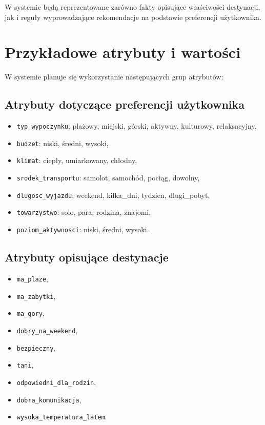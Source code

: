 \documentclass[12pt,a4paper]{article}
\begin{document}
W systemie będą reprezentowane zarówno fakty opisujące właściwości destynacji, jak i reguły wyprowadzające rekomendacje na podstawie preferencji użytkownika.

\section{Przykładowe atrybuty i wartości}

W systemie planuje się wykorzystanie następujących grup atrybutów:

\subsection{Atrybuty dotyczące preferencji użytkownika}
\begin{itemize}
    \item \texttt{typ\_wypoczynku}: plażowy, miejski, górski, aktywny, kulturowy, relaksacyjny,
    \item \texttt{budzet}: niski, średni, wysoki,
    \item \texttt{klimat}: ciepły, umiarkowany, chłodny,
    \item \texttt{srodek\_transportu}: samolot, samochód, pociąg, dowolny,
    \item \texttt{dlugosc\_wyjazdu}: weekend, kilka\_dni, tydzien, dlugi\_pobyt,
    \item \texttt{towarzystwo}: solo, para, rodzina, znajomi,
    \item \texttt{poziom\_aktywnosci}: niski, średni, wysoki.
\end{itemize}

\subsection{Atrybuty opisujące destynacje}
\begin{itemize}
    \item \texttt{ma\_plaze},
    \item \texttt{ma\_zabytki},
    \item \texttt{ma\_gory},
    \item \texttt{dobry\_na\_weekend},
    \item \texttt{bezpieczny},
    \item \texttt{tani},
    \item \texttt{odpowiedni\_dla\_rodzin},
    \item \texttt{dobra\_komunikacja},
    \item \texttt{wysoka\_temperatura\_latem}.
\end{itemize}
\end{document}
